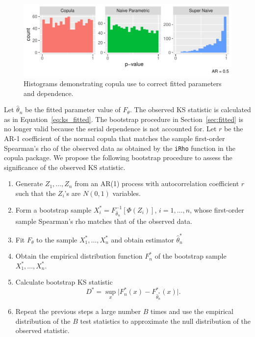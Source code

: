 \documentclass[12pt, letterpaper, titlepage]{article}
\begin{document}
\begin{figure}[tbp]
  \centering
  \includegraphics{hist_copula}
  \caption{Histograms demonstrating copula use to correct fitted parameters and dependence.}
  \label{fig:hist_copula}
\end{figure}

Let $\hat\theta_n$ be the fitted parameter value of $F_{\theta}$. The observed
KS statistic is calculated as in Equation~\eqref{eq:ks_fitted}. The bootstrap
procedure in Section~\ref{sec:fitted} is no longer valid because the serial
dependence is not accounted for. Let $r$ be the
AR-1 coefficient of the normal copula that matches the sample first-order
Spearman's rho of the observed data as obtained by the \texttt{iRho} function in
the \textsf{copula} package. We propose the following bootstrap procedure to
assess the significance of the observed KS statistic.
\begin{enumerate}
\item
  Generate $Z_1, \ldots, Z_n$ from an AR(1) process with autocorrelation
  coefficient $r$ such that the $Z_i$'s are $N(0, 1)$ variables.
\item
  Form a bootstrap sample $X_i^* = F^{-1}_{\hat\theta_n} [\Phi(Z_i)]$,
  $i = 1, \ldots, n$, whose first-order sample Spearman's rho matches that of
  the observed data.
\item
  Fit $F_\theta$ to the sample $X_1^*, \ldots, X_n^*$ and obtain estimator $\hat\theta_n^*$
\item
  Obtain the empirical distribution function $F_n^*$ of the bootstrap sample
  $X_1^*, \ldots, X_n^*$.
\item 
  Calculate bootstrap KS statistic
  \[
    D^* = \sup_x \lvert F_n^* (x)- F_{\hat\theta_n^*}^*(x) \rvert.
  \]
\item
  Repeat the previous steps a large number $B$ times and use the empirical
    distribution of the $B$ test statistics to approximate
    the null distribution of the observed statistic.      
\end{enumerate}
\end{document}
